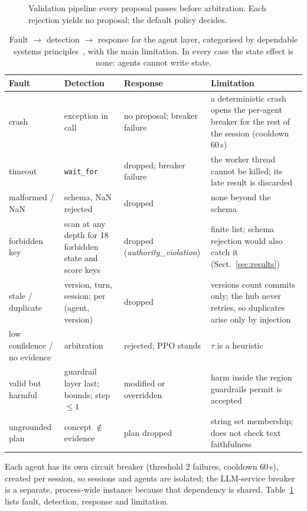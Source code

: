 \begin{figure}[tbp]
\centering
\resizebox{\textwidth}{!}{}
\caption{Validation pipeline every proposal passes before arbitration. Each rejection yields no proposal; the default policy decides.}\label{fig:valid}
\end{figure}
\begin{table}[tbp]
\centering\footnotesize
\caption{Fault $\rightarrow$ detection $\rightarrow$ response for the agent layer, categorised by dependable systems principles~\cite{alrl04}, with the main limitation. In every case the state effect is none: agents cannot write state.}\label{tab:faults}
\begin{tabular}{>{\raggedright\arraybackslash}p{1.9cm}>{\raggedright\arraybackslash}p{2.7cm}>{\raggedright\arraybackslash}p{2.5cm}>{\raggedright\arraybackslash}p{4.3cm}}
\toprule
Fault & Detection & Response & Limitation\\
\midrule
crash & exception in call & no proposal; breaker failure & a deterministic crash opens the per-agent breaker for the rest of the session (cooldown 60\,s)\\
timeout & \texttt{wait\_for} & dropped; breaker failure & the worker thread cannot be killed; its late result is discarded\\
malformed / NaN & schema, NaN rejected & dropped & none beyond the schema\\
forbidden key & scan at any depth for 18 forbidden state and score keys & dropped (\emph{authority\_violation}) & finite list; schema rejection would also catch it (Sect.~\ref{sec:results})\\
stale / duplicate & version, turn, session; per (agent, version) & dropped & versions count commits only; the hub never retries, so duplicates arise only by injection\\
low confidence / no evidence & arbitration & rejected; PPO stands & $\tau$ is a heuristic\\
valid but harmful & guardrail layer last; bounds; step $\le1$ & modified or overridden & harm inside the region guardrails permit is accepted\\
ungrounded plan & concept $\notin$ evidence & plan dropped & string set membership; does not check text faithfulness\\
\bottomrule
\end{tabular}
\end{table}
Each agent has its own circuit breaker (threshold 2 failures, cooldown 60\,s), created per session, so sessions and agents are isolated; the LLM-service breaker is a separate, process-wide instance because that dependency is shared. Table~\ref{tab:faults} lists fault, detection, response and limitation.
